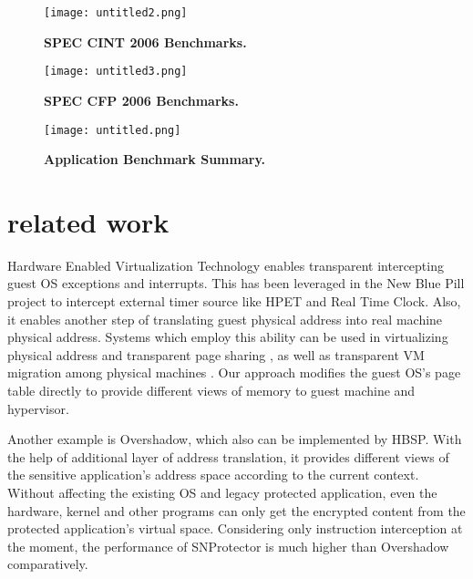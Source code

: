 \documentclass[conference]{IEEEtran}
\begin{document}
{\begin{figure}[!htb]
\begin{center}
\texttt{[image: untitled2.png]}
\end{center}
\caption{{\bf SPEC CINT 2006 Benchmarks.}} \label{Figure 6.}
\end{figure}

\begin{figure}[!htb]
\begin{center}
\texttt{[image: untitled3.png]}
\end{center}
\caption{{\bf SPEC CFP 2006 Benchmarks.}} \label{Figure 7.}
\end{figure}

\begin{figure}[!htb]
\begin{center}
\texttt{[image: untitled.png]}
\end{center}
\caption{{\bf Application Benchmark Summary.}} \label{Figure 8.}
\end{figure}





\bigskip

\section{related work}
Hardware Enabled Virtualization Technology enables transparent
intercepting guest OS exceptions and interrupts. This has been
leveraged in the New Blue Pill project to intercept external timer
source like HPET and Real Time Clock\cite{IEEEhowto:8}. Also, it
enables another step of translating guest physical address into
real machine physical address. Systems which employ this ability
can be used in virtualizing physical address\cite{IEEEhowto:9} and
transparent page sharing\cite{IEEEhowto:10} , as well as
transparent VM migration among physical machines
\cite{IEEEhowto:11}. Our approach modifies the guest OS's page
table directly to provide different views of memory to guest
machine and hypervisor.

Another example is Overshadow\cite{IEEEhowto:6}, which also can be
implemented by HBSP. With the help of additional layer of address
translation, it provides different views of the sensitive
application's address space according to the current context.
Without affecting the existing OS and legacy protected
application, even the hardware, kernel and other programs can only
get the encrypted content from the protected application's virtual
space. Considering only instruction interception at the moment,
the performance of SNProtector is much higher than Overshadow
comparatively.

}
\end{document}
